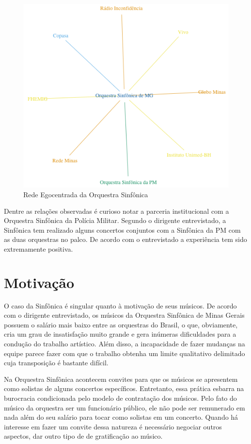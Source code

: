 \documentclass[a4paper, 12pt, openright, oneside, german, french, english, brazil]{abntex2}
\begin{document}
	\begin{figure}[!ht]
		\centering
		\caption{Rede Egocentrada da Orquestra Sinfônica}
		\label{rede-sinfonica}
		\includegraphics[scale=.7]{rede_sinfonica.png}
	\end{figure}

	Dentre as relações observadas é curioso notar a parceria institucional com a Orquestra Sinfônica da Polícia Militar. Segundo o dirigente entrevistado, a Sinfônica tem realizado alguns concertos conjuntos com a Sinfônica da PM com as duas orquestras no palco. De acordo com o entrevistado a experiência tem sido extremamente positiva.


	\section{Motivação}
	
	O caso da Sinfônica é singular quanto à motivação de seus músicos. De acordo com o dirigente entrevistado, os músicos da Orquestra Sinfônica de Minas Gerais possuem o salário mais baixo entre as orquestras do Brasil, o que, obviamente, cria um grau de insatisfação muito grande e gera inúmeras dificuldades para a condução do trabalho artístico. Além disso, a incapacidade de fazer mudanças na equipe parece fazer com que o trabalho obtenha um limite qualitativo delimitado cuja transposição é bastante difícil.
	
	Na Orquestra Sinfônica acontecem convites para que os músicos se apresentem como solistas de alguns concertos específicos. Entretanto, essa prática esbarra na burocracia condicionada pelo modelo de contratação dos músicos. Pelo fato do músico da orquestra ser um funcionário público, ele não pode ser remunerado em nada além do seu salário para tocar como solistas em um concerto. Quando há interesse em fazer um convite dessa natureza é necessário negociar outros aspectos, dar outro tipo de de gratificação ao músico.
	
\end{document}
